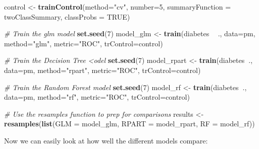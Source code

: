 \documentclass[]{book}
\newenvironment{Shaded}{\begin{snugshade}}{\end{snugshade}}
\newcommand{\KeywordTok}[1]{\textcolor[rgb]{0.13,0.29,0.53}{\textbf{#1}}}
\newcommand{\DataTypeTok}[1]{\textcolor[rgb]{0.13,0.29,0.53}{#1}}
\newcommand{\DecValTok}[1]{\textcolor[rgb]{0.00,0.00,0.81}{#1}}
\newcommand{\StringTok}[1]{\textcolor[rgb]{0.31,0.60,0.02}{#1}}
\newcommand{\CommentTok}[1]{\textcolor[rgb]{0.56,0.35,0.01}{\textit{#1}}}
\newcommand{\OtherTok}[1]{\textcolor[rgb]{0.56,0.35,0.01}{#1}}
\newcommand{\OperatorTok}[1]{\textcolor[rgb]{0.81,0.36,0.00}{\textbf{#1}}}
\newcommand{\NormalTok}[1]{#1}
\begin{document}
\begin{Shaded}
\begin{Highlighting}[]
\NormalTok{control <-}\StringTok{ }\KeywordTok{trainControl}\NormalTok{(}\DataTypeTok{method=}\StringTok{"cv"}\NormalTok{, }
                        \DataTypeTok{number=}\DecValTok{5}\NormalTok{, }
                        \DataTypeTok{summaryFunction =}\NormalTok{ twoClassSummary,}
                        \DataTypeTok{classProbs =} \OtherTok{TRUE}\NormalTok{)}

\CommentTok{# Train the glm model}
\KeywordTok{set.seed}\NormalTok{(}\DecValTok{7}\NormalTok{)}
\NormalTok{model_glm <-}\StringTok{ }\KeywordTok{train}\NormalTok{(diabetes }\OperatorTok{~}\StringTok{ }\NormalTok{., }
                   \DataTypeTok{data=}\NormalTok{pm, }
                   \DataTypeTok{method=}\StringTok{"glm"}\NormalTok{, }
                   \DataTypeTok{metric=}\StringTok{"ROC"}\NormalTok{,}
                   \DataTypeTok{trControl=}\NormalTok{control)}

\CommentTok{# Train the Decision Tree <odel}
\KeywordTok{set.seed}\NormalTok{(}\DecValTok{7}\NormalTok{)}
\NormalTok{model_rpart <-}\StringTok{ }\KeywordTok{train}\NormalTok{(diabetes}\OperatorTok{~}\NormalTok{., }
                  \DataTypeTok{data=}\NormalTok{pm, }
                  \DataTypeTok{method=}\StringTok{"rpart"}\NormalTok{, }
                  \DataTypeTok{metric=}\StringTok{"ROC"}\NormalTok{,}
                  \DataTypeTok{trControl=}\NormalTok{control)}

\CommentTok{# Train the Random Forest model}
\KeywordTok{set.seed}\NormalTok{(}\DecValTok{7}\NormalTok{)}
\NormalTok{model_rf <-}\StringTok{ }\KeywordTok{train}\NormalTok{(diabetes}\OperatorTok{~}\NormalTok{., }
                  \DataTypeTok{data=}\NormalTok{pm, }
                  \DataTypeTok{method=}\StringTok{"rf"}\NormalTok{, }
                  \DataTypeTok{metric=}\StringTok{"ROC"}\NormalTok{,}
                  \DataTypeTok{trControl=}\NormalTok{control)}

\CommentTok{# Use the resamples function to prep for comparisons}
\NormalTok{results <-}\StringTok{ }\KeywordTok{resamples}\NormalTok{(}\KeywordTok{list}\NormalTok{(}\DataTypeTok{GLM   =}\NormalTok{ model_glm, }
                          \DataTypeTok{RPART =}\NormalTok{ model_rpart, }
                          \DataTypeTok{RF    =}\NormalTok{ model_rf))}
\end{Highlighting}
\end{Shaded}

Now we can easily look at how well the different models compare:
\end{document}
